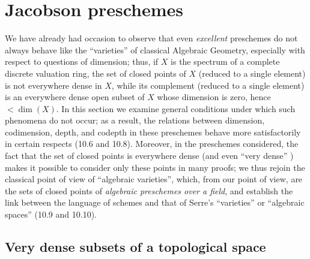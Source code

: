 \section{Jacobson preschemes}
\label{section:IV.10}

We have already had occasion to observe  that even
\emph{excellent} preschemes  do not always behave like the
``varieties'' of classical Algebraic Geometry, especially with respect to
questions of dimension; thus, if $X$ is the spectrum of a complete discrete
valuation ring, the set of closed points of $X$ (reduced to a single element)
is not everywhere dense in $X$, while its complement (reduced to a single
element) is an everywhere dense open subset of $X$ whose dimension is zero,
hence $<\dim(X)$. In this section we examine general conditions under which
such phenomena do not occur; as a result, the relations between dimension,
codimension, depth, and codepth in these preschemes behave more satisfactorily
in certain respects (10.6 and 10.8). Moreover, in the preschemes considered,
the fact that the set of closed points is everywhere dense (and even ``very
dense'' ) makes it possible to consider only these points in
many proofs; we thus rejoin the classical point of view of ``algebraic
varieties'', which, from our point of view, are the sets of closed points of
\emph{algebraic preschemes over a field}, and establish the link between the
language of schemes and that of Serre's ``varieties'' or ``algebraic spaces''
(10.9 and 10.10).

\subsection{Very dense subsets of a topological space}
\label{subsection:IV.10.1}

